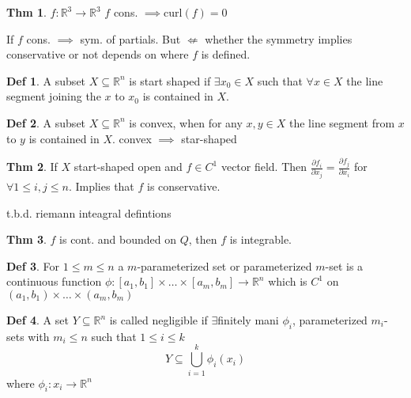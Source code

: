 \documentclass[a4paper, 10pt]{article}
\theoremstyle{definition}
\newtheorem*{theorem}{Thm}
\newtheorem*{definition}{Def}
\newcommand{\R}{\mathbb{R}}
\begin{document}
\begin{theorem}
    \(f: \R^3 \to \R^3\) \(f\) cons. \(\implies \text{curl}(f) = 0\)
\end{theorem}

\begin{note*}
    If \(f\) cons. \(\implies\) sym. of partials. But \(\not\Leftarrow\) whether the symmetry implies conservative or not depends on where \(f\) is defined.
\end{note*}

\begin{definition}
    A subset \(X \subseteq \R^n\) is start shaped if \(\exists x_0 \in X\) such that \(\forall x \in X\) the line segment joining the \(x\) to \(x_0\) is contained in \(X\).
\end{definition}

\begin{definition}
    A subset \(X \subseteq \R^n\) is convex, when for any \(x, y \in X\) the line segment from \(x\) to \(y\) is contained in \(X\). convex \(\implies\) star-shaped
\end{definition}

\begin{theorem}
    If \(X\) start-shaped open and \(f \in C^1\) vector field. Then \(\frac{\partial f_i}{\partial x_j} = \frac{\partial f_j}{\partial x_i}\) for \(\forall 1 \leq i, j \leq n\). Implies that \(f\) is conservative.
\end{theorem}

t.b.d. riemann inteagral defintions

\begin{theorem}
    \(f\) is cont. and bounded on \(Q\), then \(f\) is integrable.
\end{theorem}

\begin{definition}
    For \(1 \leq m \leq n\) a \(m\)-parameterized set or parameterized \(m\)-set is a continuous function \(\phi: [a_1, b_1] \times \ldots \times [a_m, b_m] \to \R^n\) which is \(C^1\) on \((a_1, b_1) \times \ldots \times (a_m, b_m)\)
\end{definition}

\begin{definition}
    A set \(Y \subseteq \R^n\) is called negligible if \(\exists\)finitely mani \(\phi_i\), parameterized \(m_i\)-sets with \(m_i \leq n\) such that \(1 \leq i \leq k\)
    \[Y \subseteq \bigcup_{i = 1}^k \phi_i(x_i)\]
    where \(\phi_i: x_i \to \R^n\)
\end{definition}
\end{document}
